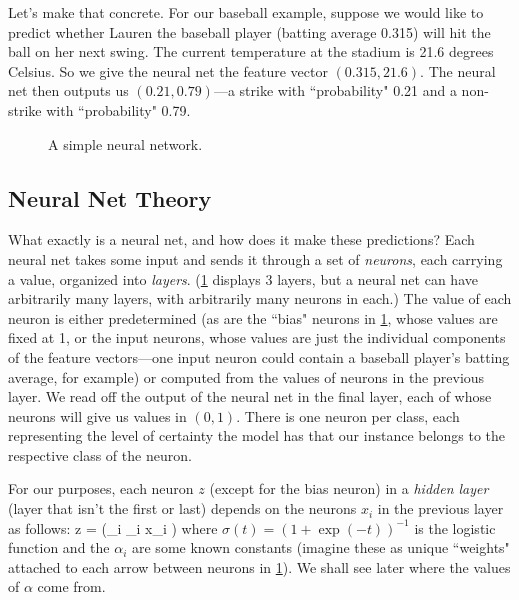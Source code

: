 \documentclass[10pt]{article}
\begin{document}
Let's make that concrete.
For our baseball example, suppose we would like to predict whether Lauren the baseball player (batting average 0.315) will hit the ball on her next swing.
The current temperature at the stadium is 21.6 degrees Celsius.
So we give the neural net the feature vector $(0.315, 21.6)$.
The neural net then outputs us $(0.21, 0.79)$---a strike with ``probability" 0.21 and a non-strike with ``probability" 0.79.

\begin{figure}[htbp]
\centering

\caption{A simple neural network.}
\label{fig:neuralnet}
\end{figure}


\subsection{Neural Net Theory}

What exactly is a neural net, and how does it make these predictions?
Each neural net takes some input and sends it through a set of \emph{neurons}, each carrying a value, organized into \emph{layers}.
(\cref{fig:neuralnet} displays 3 layers, but a neural net can have arbitrarily many layers, with arbitrarily many neurons in each.)
The value of each neuron is either predetermined (as are the ``bias" neurons in \cref{fig:neuralnet}, whose values are fixed at 1, or the input neurons, whose values are just the individual components of the feature vectors---one input neuron could contain a baseball player's batting average, for example) or computed from the values of neurons in the previous layer.
We read off the output of the neural net in the final layer, each of whose neurons will give us values in $(0, 1)$. There is one neuron per class, each representing the level of certainty the model has that our instance belongs to the respective class of the neuron.

For our purposes, each neuron $z$ (except for the bias neuron) in a \emph{hidden layer} (layer that isn't the first or last) depends on the neurons $x_i$ in the previous layer as follows:
\beq
\label{eq:hiddenlayer}
z = \sigma\left(\sum_i \alpha_i x_i \right)
\eeq
where $\sigma(t) = (1 + \exp(-t))^{-1}$ is the logistic function and the $\alpha_i$ are some known constants (imagine these as unique ``weights" attached to each arrow between neurons in \cref{fig:neuralnet}).
We shall see later where the values of $\alpha$ come from.
\end{document}

